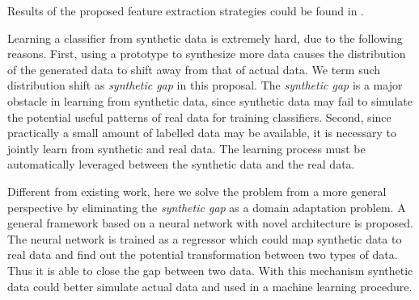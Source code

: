 \documentclass{iitthesis}
\begin{document}
Results of the proposed feature extraction strategies could be found in \cite{Zhang2014Autoencoder}\cite{AndiZang2015}\cite{ZX:14}\cite{ZX:14b}.

%

 Learning a classifier from synthetic data is extremely hard, due to the following reasons. First, using a prototype to synthesize more data causes the distribution of the generated data to shift away from that of actual data. We term such distribution shift as \textit{synthetic gap} in this proposal. The \textit{synthetic gap} is a major obstacle in learning from synthetic data, since synthetic data may fail to simulate the potential useful patterns of real data for training classifiers. Second, since practically a small amount of labelled data may be available, it is necessary to jointly learn from synthetic and real data. The learning process must be automatically leveraged between the synthetic data and the real data. 

Different from existing work, here we solve the problem from a more general perspective by eliminating the \textit{synthetic gap} as a domain adaptation problem. A general framework based on a neural network with novel architecture is proposed. The neural network is trained as a regressor which could map synthetic data to real data and find out the potential transformation between two types of data. Thus it is able to close the gap between two data. With this mechanism synthetic data could better simulate actual data and used in a machine learning procedure.
\end{document}
